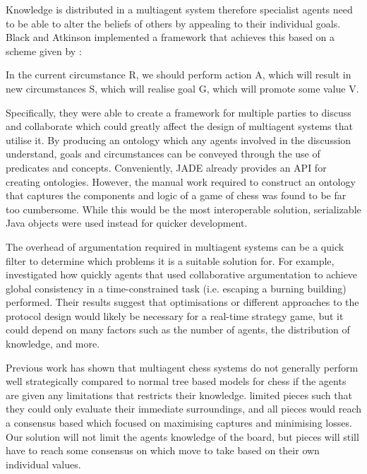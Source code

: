 \documentclass{article}
\begin{document}
Knowledge is distributed in a multiagent system therefore specialist agents need to be able to alter the beliefs of others by appealing to their individual goals. Black and Atkinson \cite{argumentation} implemented a framework that achieves this based on a scheme given by \cite{reasoning}:

\begin{displayquote}
	In the current circumstance R, we should perform action A, which will result in new circumstances S, which will realise goal G, which will promote some value V.
\end{displayquote}

Specifically, they were able to create a framework for multiple parties to discuss and collaborate which could greatly affect the design of multiagent systems that utilise it. By producing an ontology which any agents involved in the discussion understand, goals and circumstances can be conveyed through the use of predicates and concepts. Conveniently, JADE already provides an API for creating ontologies. However, the manual work required to construct an ontology that captures the components and logic of a game of chess was found to be far too cumbersome. While this would be the most interoperable solution, serializable Java objects were used instead for quicker development. 

The overhead of argumentation required in multiagent systems can be a quick filter to determine which problems it is a suitable solution for. For example, \cite{argumentationcontext} investigated how quickly agents that used collaborative argumentation to achieve global consistency in a time-constrained task (i.e. escaping a burning building) performed. Their results suggest that optimisations or different approaches to the protocol design would likely be necessary for a real-time strategy game, but it could depend on many factors such as the number of agents, the distribution of knowledge, and more.

Previous work has shown that multiagent chess systems do not generally perform well strategically compared to normal tree based models for chess if the agents are given any limitations that restricts their knowledge. \cite{agentchess} limited pieces such that they could only evaluate their immediate surroundings, and all pieces would reach a consensus based which focused on maximising captures and minimising losses. Our solution will not limit the agents knowledge of the board, but pieces will still have to reach some consensus on which move to take based on their own individual values. 
\end{document}
